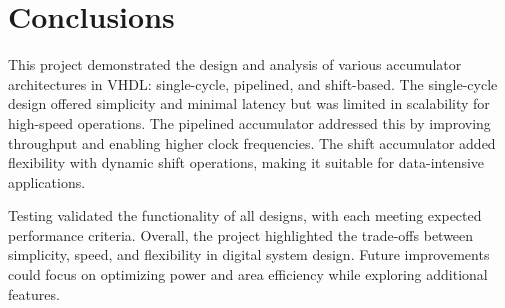 \documentclass[a4paper,12pt]{article}
\begin{document}
\section{Conclusions}
This project demonstrated the design and analysis of various accumulator architectures in VHDL: single-cycle, pipelined, and shift-based. The single-cycle design offered simplicity and minimal latency but was limited in scalability for high-speed operations. The pipelined accumulator addressed this by improving throughput and enabling higher clock frequencies. The shift accumulator added flexibility with dynamic shift operations, making it suitable for data-intensive applications.

Testing validated the functionality of all designs, with each meeting expected performance criteria. Overall, the project highlighted the trade-offs between simplicity, speed, and flexibility in digital system design. Future improvements could focus on optimizing power and area efficiency while exploring additional features.
\end{document}
